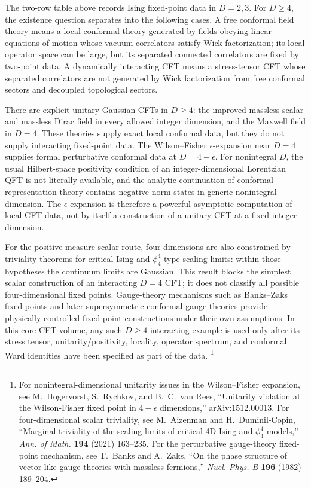 \begin{remark}
\label{rem:cft-opening-dgefour-existence}
The two-row table above records Ising fixed-point data in \(D=2,3\).  For
\(D\geq4\), the existence question separates into the following cases.  A free
conformal field theory means a local conformal theory generated by fields
obeying linear equations of motion whose vacuum correlators satisfy Wick
factorization; its local operator space can be large, but its separated
connected correlators are fixed by two-point data.  A dynamically interacting
CFT means a stress-tensor CFT whose separated correlators are not generated by
Wick factorization from free conformal sectors and decoupled topological
sectors.

There are explicit unitary Gaussian CFTs in \(D\geq4\): the improved massless
scalar and massless Dirac field in every allowed integer dimension, and the
Maxwell field in \(D=4\).  These theories supply exact local conformal data, but
they do not supply interacting fixed-point data.  The Wilson--Fisher
\(\epsilon\)-expansion near \(D=4\) supplies formal perturbative conformal data
at \(D=4-\epsilon\).  For nonintegral \(D\), the usual Hilbert-space positivity
condition of an integer-dimensional Lorentzian QFT is not literally available,
and the analytic continuation of conformal representation theory contains
negative-norm states in generic nonintegral dimension.  The
\(\epsilon\)-expansion is therefore a powerful asymptotic computation of local
CFT data, not by itself a construction of a unitary CFT at a fixed integer
dimension.

For the positive-measure scalar route, four dimensions are also constrained by
triviality theorems for critical Ising and \(\phi^4_4\)-type scaling limits:
within those hypotheses the continuum limits are Gaussian.  This result blocks
the simplest scalar construction of an interacting \(D=4\) CFT; it does not
classify all possible four-dimensional fixed points.  Gauge-theory mechanisms
such as Banks--Zaks fixed points and later supersymmetric conformal gauge
theories provide physically controlled fixed-point constructions under their
own assumptions.  In this core CFT volume, any such \(D\geq4\) interacting
example is used only after its stress tensor, unitarity/positivity, locality,
operator spectrum, and conformal Ward identities have been specified as part of
the data.
\footnote{For nonintegral-dimensional unitarity issues in the
Wilson--Fisher expansion, see M.~Hogervorst, S.~Rychkov, and B.~C.~van Rees,
``Unitarity violation at the Wilson-Fisher fixed point in
\(4-\epsilon\) dimensions,'' arXiv:1512.00013.  For four-dimensional scalar
triviality, see M.~Aizenman and H.~Duminil-Copin, ``Marginal triviality of the
scaling limits of critical 4D Ising and \(\phi^4_4\) models,''
\emph{Ann. of Math.} \textbf{194} (2021) 163--235.  For the perturbative
gauge-theory fixed-point mechanism, see T.~Banks and A.~Zaks, ``On the phase
structure of vector-like gauge theories with massless fermions,''
\emph{Nucl. Phys. B} \textbf{196} (1982) 189--204.}
\end{remark}

